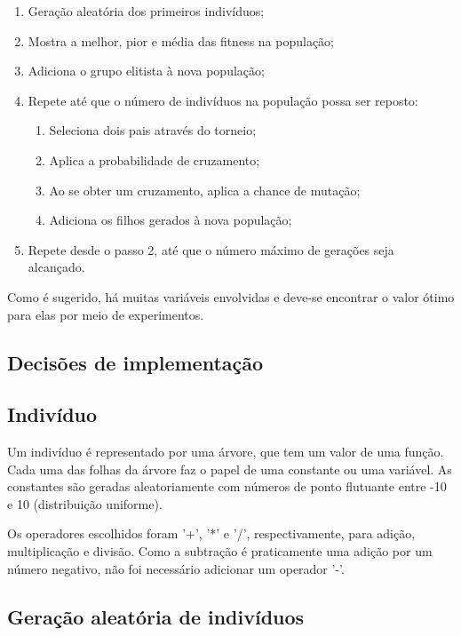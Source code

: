 \documentclass[11pt]{article}
\begin{document}
\begin{enumerate}
	\item Geração aleatória dos primeiros indivíduos;
	\item Mostra a melhor, pior e média das fitness na população;
	\item Adiciona o grupo elitista à nova população;
	\item Repete até que o número de indivíduos na população possa ser reposto:
	\begin{enumerate}
		\item Seleciona dois pais através do torneio;
		\item Aplica a probabilidade de cruzamento;
		\item Ao se obter um cruzamento, aplica a chance de mutação;
		\item Adiciona os filhos gerados à nova população;
	\end{enumerate}
	\item Repete desde o passo 2, até que o número máximo de gerações seja alcançado.
\end{enumerate}

Como é sugerido, há muitas variáveis envolvidas e deve-se encontrar o valor ótimo para elas por meio de experimentos.

\subsection{Decisões de implementação}
  
\subsection*{Indivíduo}

Um indivíduo é representado por uma árvore, que tem um valor de uma função. Cada uma das folhas da árvore faz o papel de uma constante ou uma variável. As constantes são geradas aleatoriamente com números de ponto flutuante entre -10 e 10 (distribuição uniforme).

Os operadores escolhidos foram '+', '*' e '/', respectivamente, para adição, multiplicação e divisão. Como a subtração é praticamente uma adição por um número negativo, não foi necessário adicionar um operador '-'. 

\subsection*{Geração aleatória de indivíduos}
\end{document}
